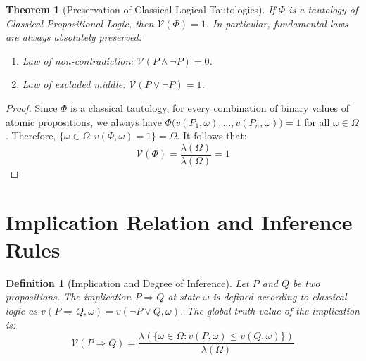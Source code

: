 \documentclass[a4paper,12pt,twoside]{memoir}
\newtheorem{definition}{Definition}[chapter]
\newtheorem{theorem}{Theorem}[chapter]
\newcommand{\ddclmd}{\mathcal{V}} %
\begin{document}
	\begin{theorem}[Preservation of Classical Logical Tautologies]
		If $\Phi$ is a tautology of Classical Propositional Logic, then $\ddclmd(\Phi) = 1$. In particular, fundamental laws are always absolutely preserved:
		\begin{enumerate}[leftmargin=*]
			\item Law of non-contradiction: $\ddclmd(P \land \neg P) = 0$.
			\item Law of excluded middle: $\ddclmd(P \lor \neg P) = 1$.
		\end{enumerate}
	\end{theorem}
	
	\begin{proof}
		Since $\Phi$ is a classical tautology, for every combination of binary values of atomic propositions, we always have $\Phi\big(v(P_1, \omega), \dots, v(P_n, \omega)\big) = 1$ for all $\omega \in \Omega$.
		Therefore, $\{\omega \in \Omega : v(\Phi, \omega) = 1\} = \Omega$. It follows that:
		\[
		\ddclmd(\Phi) = \frac{\lambda(\Omega)}{\lambda(\Omega)} = 1
		\]
	\end{proof}
	
	\section{Implication Relation and Inference Rules}
	
	\begin{definition}[Implication and Degree of Inference]
		Let $P$ and $Q$ be two propositions. The implication $P \Rightarrow Q$ at state $\omega$ is defined according to classical logic as $v(P \Rightarrow Q, \omega) = v(\neg P \lor Q, \omega)$. The global truth value of the implication is:
		\[
		\ddclmd(P \Rightarrow Q) = \frac{\lambda(\{\omega \in \Omega : v(P, \omega) \le v(Q, \omega)\})}{\lambda(\Omega)}
		\]
	\end{definition}
	
\end{document}
